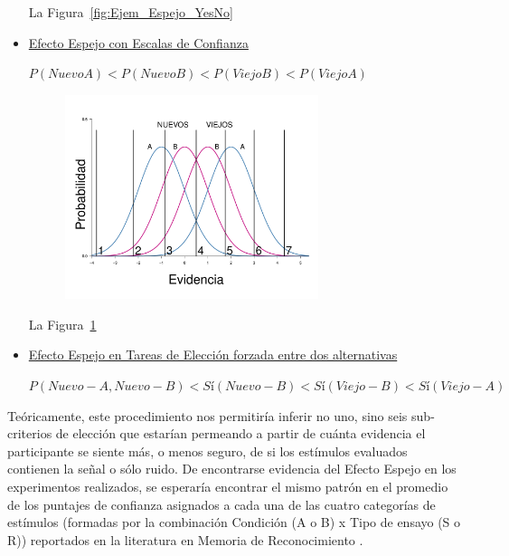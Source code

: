 \begin{itemize}
La Figura~\ref{fig:Ejem_Espejo_YesNo}

\item \underline{Efecto Espejo con Escalas de Confianza}\\


\begin{center}
$P(NuevoA) < P(NuevoB) < P(ViejoB) < P(ViejoA)$\\
\end{center}


\begin{figure}[th]
\centering
\includegraphics[width=0.7\textwidth]{Figures/EfectoEspejo_Puntajes}
\caption[Representación gráfica de los sub-Criterios para la emisión de puntajes de confianza ]{}
\label{fig:Ejem_Efecto_Punt}
\end{figure}


La Figura~\ref{fig:Ejem_Efecto_Punt}

\item \underline{Efecto Espejo en Tareas de Elección forzada entre dos alternativas}\\


\begin{center}
$P(Nuevo-A, Nuevo-B) < Sí(Nuevo-B) < Sí(Viejo-B) < Sí(Viejo-A)$\\
\end{center}


\end{itemize}

Teóricamente, este procedimiento nos permitiría inferir no uno, sino seis sub-criterios de elección que estarían permeando a partir de cuánta evidencia el participante se siente más, o menos seguro, de si los estímulos evaluados contienen la señal o sólo ruido. De encontrarse evidencia del Efecto Espejo en los experimentos realizados, se esperaría encontrar el mismo patrón en el promedio de los puntajes de confianza asignados a cada una de las cuatro categorías de estímulos (formadas por la combinación Condición (A o B) x Tipo de ensayo (S o R)) reportados en la literatura en Memoria de Reconocimiento \parencite{Glanzer1990, Glanzer1993}. \\




